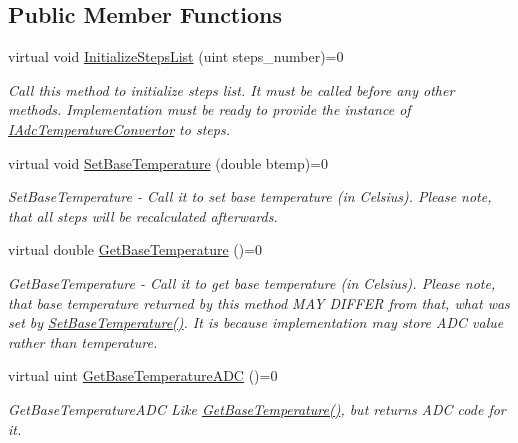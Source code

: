 \subsection*{Public Member Functions}
\begin{DoxyCompactItemize}
\item 
virtual void \hyperlink{class_interfaces_1_1_i_settings_generator_a4aa0307e906c003012aad75101072c65}{Initialize\+Steps\+List} (uint steps\+\_\+number)=0
\begin{DoxyCompactList}\small\item\em Call this method to initialize steps list. It must be called before any other methods. Implementation must be ready to provide the instance of \hyperlink{class_interfaces_1_1_i_adc_temperature_convertor}{I\+Adc\+Temperature\+Convertor} to steps. \end{DoxyCompactList}\item 
virtual void \hyperlink{class_interfaces_1_1_i_settings_generator_a8b60ba05790994db0303b251f655e95d}{Set\+Base\+Temperature} (double btemp)=0
\begin{DoxyCompactList}\small\item\em Set\+Base\+Temperature -\/ Call it to set base temperature (in Celsius). Please note, that all steps will be recalculated afterwards. \end{DoxyCompactList}\item 
virtual double \hyperlink{class_interfaces_1_1_i_settings_generator_a9cc36185b446f21e09a0e5633f39a1c5}{Get\+Base\+Temperature} ()=0
\begin{DoxyCompactList}\small\item\em Get\+Base\+Temperature -\/ Call it to get base temperature (in Celsius). Please note, that base temperature returned by this method M\+AY D\+I\+F\+F\+ER from that, what was set by \hyperlink{class_interfaces_1_1_i_settings_generator_a8b60ba05790994db0303b251f655e95d}{Set\+Base\+Temperature()}. It is because implementation may store A\+DC value rather than temperature. \end{DoxyCompactList}\item 
virtual uint \hyperlink{class_interfaces_1_1_i_settings_generator_a1000ff41c6eecdb55a46c859ca0ebe67}{Get\+Base\+Temperature\+A\+DC} ()=0
\begin{DoxyCompactList}\small\item\em Get\+Base\+Temperature\+A\+DC Like \hyperlink{class_interfaces_1_1_i_settings_generator_a9cc36185b446f21e09a0e5633f39a1c5}{Get\+Base\+Temperature()}, but returns A\+DC code for it. \end{DoxyCompactList}\item 

\end{DoxyCompactItemize}

